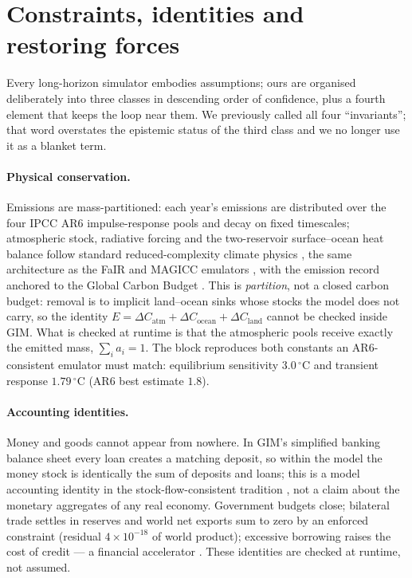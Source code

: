 \documentclass[12pt,a4paper]{article}
\newcommand{\degC}{$^{\circ}$C}
\begin{document}
\section{Constraints, identities and restoring forces}
\label{sec:invariants}

Every long-horizon simulator embodies assumptions; ours are organised deliberately into three
classes in descending order of confidence, plus a fourth element that keeps the loop near
them. We previously called all four ``invariants''; that word overstates the epistemic status
of the third class and we no longer use it as a blanket term.

\paragraph{Physical conservation.} Emissions are mass-partitioned: each year's emissions are
distributed over the four IPCC AR6 impulse-response pools and decay on fixed timescales;
atmospheric stock, radiative forcing and the two-reservoir surface--ocean heat balance follow
standard reduced-complexity climate physics
\citep{joos2013,geoffroy2013,ipcc_ar6_wg1,forster2021}, the same architecture as the FaIR and
MAGICC emulators \citep{smith2018fair,meinshausen2011}, with the emission record anchored to
the Global Carbon Budget \citep{friedlingstein2023}. This is \emph{partition}, not a closed carbon budget: removal is to implicit land--ocean sinks
whose stocks the model does not carry, so the identity
$E=\Delta C_{\mathrm{atm}}+\Delta C_{\mathrm{ocean}}+\Delta C_{\mathrm{land}}$ cannot be
checked inside GIM. What is checked at runtime is that the atmospheric pools receive exactly
the emitted mass, $\sum_i a_i = 1$. The block reproduces both constants an AR6-consistent
emulator must match: equilibrium sensitivity $3.0$\,\degC{} and transient response
$1.79$\,\degC{} (AR6 best estimate $1.8$).

\paragraph{Accounting identities.} Money and goods cannot appear from nowhere. In GIM's
simplified banking balance sheet every loan creates a matching deposit, so within the model
the money stock is identically the sum of deposits and loans; this is a model accounting
identity in the stock-flow-consistent tradition \citep{godley2007}, not a claim about the
monetary aggregates of any real economy. Government budgets close; bilateral trade settles in
reserves and world net exports sum to zero by an enforced constraint (residual $4\times
10^{-18}$ of world product); excessive borrowing raises the cost of credit --- a financial
accelerator \citep{bernanke1999}. These identities are checked at runtime, not assumed.
\end{document}
